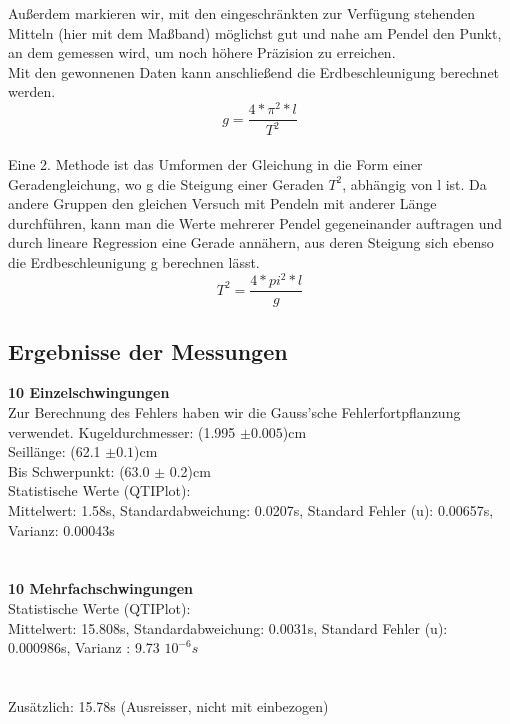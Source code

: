 \documentclass[12pt,a4paper]{article}
\begin{document}
\begin{multicols}{2}
Außerdem markieren wir, mit den eingeschränkten zur Verfügung stehenden Mitteln (hier mit dem Maßband) möglichst gut und nahe am Pendel den Punkt, an dem gemessen wird, um noch höhere Präzision zu erreichen.
\\
Mit den gewonnenen Daten kann anschließend die Erdbeschleunigung berechnet werden.\\
\begin{equation}
	g = \frac{4*\pi^2*l}{T^2}
\end{equation}
\\
Eine 2. Methode ist das Umformen der Gleichung in die Form einer Geradengleichung, wo g die Steigung einer Geraden
$T^2$, abhängig von l ist. Da andere Gruppen den gleichen Versuch mit Pendeln mit anderer Länge durchführen, kann man die Werte mehrerer Pendel gegeneinander auftragen und durch lineare Regression eine Gerade annähern, aus deren Steigung sich ebenso die Erdbeschleunigung g berechnen lässt.\\
\begin{equation}
	T^2= \frac{4*pi^2*l}{g}
\end{equation}

\subsection{Ergebnisse der Messungen}
\textbf{10 Einzelschwingungen}\\
Zur Berechnung des Fehlers haben wir die Gauss'sche Fehlerfortpflanzung verwendet.
Kugeldurchmesser: (1.995 $\pm 0.005$)cm\\
Seillänge: (62.1 $\pm  0.1$)cm\\
Bis Schwerpunkt: (63.0 $\pm$ 0.2)cm\\
Statistische Werte (QTIPlot):\\
Mittelwert: 1.58s, Standardabweichung: 0.0207s, Standard Fehler (u): 0.00657s, Varianz: 0.00043s\\
\\
\\
\textbf{10 Mehrfachschwingungen}\\
Statistische Werte (QTIPlot):\\
Mittelwert: 15.808s, Standardabweichung: 0.0031s, Standard Fehler (u): 0.000986s, Varianz : 9.73 $10^{-6}s$\\
\\
\\
Zusätzlich: 15.78s (Ausreisser, nicht mit einbezogen)\\

\end{multicols}
\end{document}
